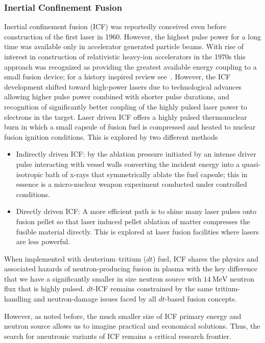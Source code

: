 \documentclass[particles,article,accept,pdftex,moreauthors]{Definitions/mdpi}
\begin{document}
\subsubsection{Inertial Confinement Fusion}\label{sssec:picoICF}
Inertial confinement fusion (ICF) was reportedly conceived even before construction of the first laser in 1960. However, the highest pulse power for a long time was available only in accelerator generated particle beams. With rise of interest in construction of relativistic heavy-ion accelerators in the 1970s this approach was recognized as providing the greatest available energy coupling to a small fusion device; for a history inspired review see~\cite{hofmann2018review}. However, the ICF development shifted toward high-power lasers due to technological advances allowing higher pulse power combined with shorter pulse durations, and recognition of significantly better coupling of the highly pulsed laser power to electrons in the target. Laser driven ICF offers a highly pulsed thermonuclear burn in which a small capsule of fusion fuel is compressed and heated to nuclear fusion ignition conditions. This is explored by two different methods~\cite{Hurricane:2023Review}
\begin{itemize}
\item 
Indirectly driven ICF: by the ablation pressure initiated by an intense driver pulse interacting with vessel walls converting the incident energy into a quasi-isotropic bath of x-rays that symmetrically ablate the fuel capsule; this in essence is a micro-nuclear weapon experiment conducted under controlled conditions.
\item 
Directly driven ICF: A more efficient path is to shine many laser pulses onto fusion pellet so that laser induced pellet ablation of matter compresses the fusible material directly. This is explored at laser fusion facilities where lasers are less powerful.
\end{itemize}
When implemented with deuterium--tritium ($dt$) fuel, ICF shares the physics and associated hazards of neutron-producing fusion in plasma with the key difference that we have a significantly smaller in size neutron source with $14~\mathrm{MeV}$ neutron flux that is highly pulsed. $dt$-ICF remains constrained by the same tritium-handling and neutron-damage issues faced by all $dt$-based fusion concepts. 

However, as noted before, the much smaller size of ICF primary energy and neutron source allows us to imagine practical and economical solutions. Thus, the search for aneutronic variants of ICF remains a critical research frontier.
\end{document}
